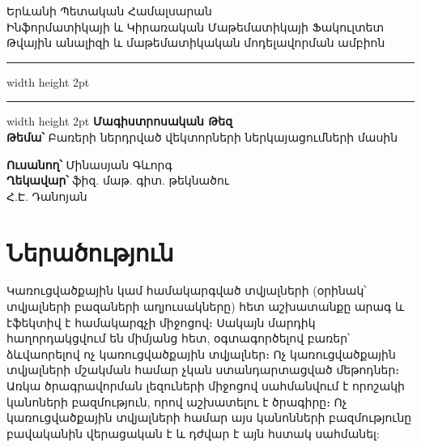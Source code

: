\documentclass[11pt]{article}
\begin{document}
\newtheorem{theorem}{Թեորեմ}
\newtheorem{lemma}{Լեմմա}
\newtheorem{corollary}{Հետևանք}
\newtheorem{preposition}{Պնդում}
\newtheorem{defination}{Սահմանում}


\theoremstyle{definition} %
\newtheorem{innercustomcase}{Դեպք}
\newenvironment{customcase}[1]
  {\renewcommand\theinnercustomcase{#1}\innercustomcase}
  {\endinnercustomcase}
\newtheorem{case}{Դեպք}

\raggedbottom


\begin{titlepage}

\begin{center}
\large  Երևանի Պետական Համալսարան\\
\large Ինֆորմատիկայի և Կիրառական Մաթեմատիկայի Ֆակուլտետ\\
 Թվային անալիզի և մաթեմատիկական մոդելավորման ամբիոն\\
 \vspace{2mm}
\hrule width \hsize height 2pt  \kern 1mm \hrule width \hsize height 2pt 
\vspace{50mm}
\textbf{\huge Մագիստրոսական Թեզ\\}\noindent \newline \newline
\textbf{\large Թեմա՝}	\hspace{3mm}  Բառերի ներդրված վեկտորների ներկայացումների մասին
\end{center}
\vspace{25mm}
\begin{flushright}
\textbf{\large Ուսանող՝ \hspace{18mm}}			Մինասյան Գևորգ \\
\vspace{4mm}
\textbf{\large Ղեկավար՝ \hspace{2mm}}			ֆիզ. մաթ. գիտ. թեկնածու \\  Հ.Է. Դանոյան
\end{flushright}
\vspace{64mm}
\end{titlepage}
\tableofcontents
\newpage
\section*{\hfill Ներածություն \hfill} \noindent
{}
{}

\par Կառուցվածքային կամ համակարգված տվյալների  (օրինակ՝ տվյալների բազաների աղյուսակները) հետ աշխատանքը արագ և էֆեկտիվ է համակարգչի միջոցով։ Սակայն մարդիկ  հաղորդակցվում են միմյանց հետ, օգտագործելով բառեր՝  ձևվաորելով ոչ կառուցվածքային տվյալներ։ Ոչ կառուցվածքային տվյալների մշակման համար չկան ստանդարտացված  մեթոդներ։ Առկա  ծրագրավորման լեզուների միջոցով սահմանվում է որոշակի կանոների բազմություն, որով աշխատելու է ծրագիրը։ Ոչ կառուցվածքային տվյալների համար այս կանոնների բազմությունը բավականին վերացական է և դժվար է այն հստակ սահմանել:
\end{document}
